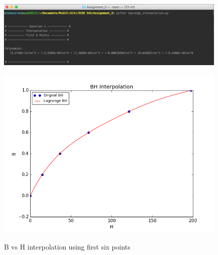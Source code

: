 \documentclass[11pt]{article}
\begin{document}
\begin{figure}[!hbp]
	\begin{center}
		\begin{minipage}{ \textwidth}
			\includegraphics[width= \textwidth]{o_L_BH_first_six.png}\\
		\end{minipage}
		\begin{minipage}{ \textwidth}
			\includegraphics[width=\textwidth]{L_BH_first_six.png}\\
		\end{minipage}
		\caption{\label{fig:L_BH_first_six}B vs H interpolation using first six points}
	\end{center}
\end{figure}
\end{document}
